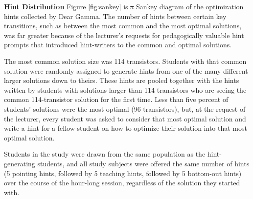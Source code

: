 \documentclass[12pt,twoside]{mitthesis}
\providecommand{\DIFaddtex}[1]{{\protect\color{blue}\uwave{#1}}} %
\providecommand{\DIFdeltex}[1]{{\protect\color{red}\sout{#1}}}                      %
\providecommand{\DIFaddbegin}{} %
\providecommand{\DIFaddend}{} %
\providecommand{\DIFdelbegin}{} %
\providecommand{\DIFdelend}{} %
\providecommand{\DIFadd}[1]{\texorpdfstring{\DIFaddtex{#1}}{#1}} %
\providecommand{\DIFdel}[1]{\texorpdfstring{\DIFdeltex{#1}}{}} %
\begin{document}
{\bf Hint Distribution} Figure \ref{fig:sankey} is \DIFdelbegin \DIFdel{a }\DIFdelend \DIFaddbegin \DIFadd{the }\DIFaddend Sankey diagram of the optimization hints collected by Dear Gamma. The number of hints between certain key transitions, such as between the most common and the most optimal solutions, was far greater because of the lecturer's requests for pedagogically valuable hint prompts that introduced hint-writers to the common and optimal solutions. 

The most common solution size was 114 transistors. Students with that common solution were randomly assigned to generate hints from one of the many different larger solutions down to theirs. These hints are pooled together with the hints written by students with solutions larger than 114 transistors who are seeing the common 114-transistor solution for the first time. Less than five percent of \DIFdelbegin \DIFdel{students' }\DIFdelend \DIFaddbegin \DIFadd{student }\DIFaddend solutions were the most optimal (96 transistors), but, at the request of the lecturer, every student was asked to consider that most optimal solution and write a hint for a fellow student on how to optimize their solution into that most optimal solution.

Students in the study were drawn from the same population as the hint-generating students, and all study subjects were offered the same number of hints (5 pointing hints, followed by 5 teaching hints, followed by 5 bottom-out hints) over the course of the hour-long session, regardless of the solution they started with. 
\end{document}
